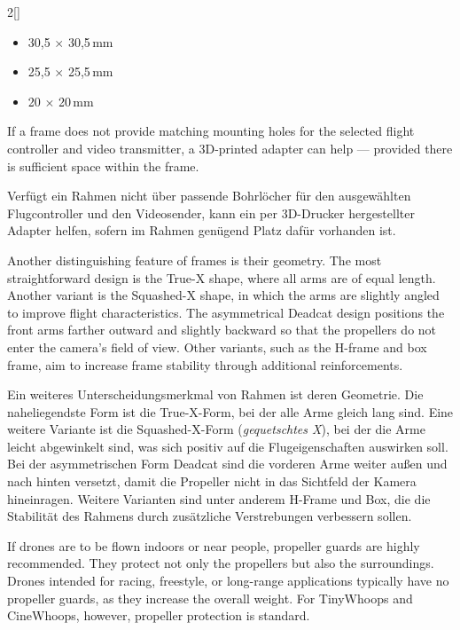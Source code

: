 \begin{paracol}{2}[]
\colger

\begin{itemize}
\item 30,5 \(\times\) 30,5\,mm
\item 25,5 \(\times\) 25,5\,mm
\item 20 \(\times\) 20\,mm
\end{itemize}

\coleng

If a frame does not provide matching mounting holes for the selected flight controller and video transmitter, a 3D-printed adapter can help — provided there is sufficient space within the frame.

\colger

Verfügt ein Rahmen nicht über passende Bohrlöcher für den ausgewählten Flugcontroller und den Videosender, kann ein per 3D-Drucker hergestellter Adapter helfen, sofern im Rahmen genügend Platz dafür vorhanden ist.

\coleng

Another distinguishing feature of frames is their geometry. The most straightforward design is the True-X shape, where all arms are of equal length. Another variant is the Squashed-X shape, in which the arms are slightly angled to improve flight characteristics. The asymmetrical Deadcat design positions the front arms farther outward and slightly backward so that the propellers do not enter the camera’s field of view. Other variants, such as the H-frame and box frame, aim to increase frame stability through additional reinforcements.

\colger

Ein weiteres Unterscheidungsmerkmal von Rahmen ist deren Geometrie. Die naheliegendste Form ist die True-X-Form, bei der alle Arme gleich lang sind. Eine weitere Variante ist die Squashed-X-Form (\textsl{gequetschtes X}), bei der die Arme leicht abgewinkelt sind, was sich positiv auf die Flugeigenschaften auswirken soll. Bei der asymmetrischen Form Deadcat sind die vorderen Arme weiter außen und nach hinten versetzt, damit die Propeller nicht in das Sichtfeld der Kamera hineinragen. Weitere Varianten sind unter anderem H-Frame und Box, die die Stabilität des Rahmens durch zusätzliche Verstrebungen verbessern sollen.

\coleng

If drones are to be flown indoors or near people, propeller guards are highly recommended. They protect not only the propellers but also the surroundings. Drones intended for racing, freestyle, or long-range applications typically have no propeller guards, as they increase the overall weight. For TinyWhoops and CineWhoops, however, propeller protection is standard.


\end{paracol}
